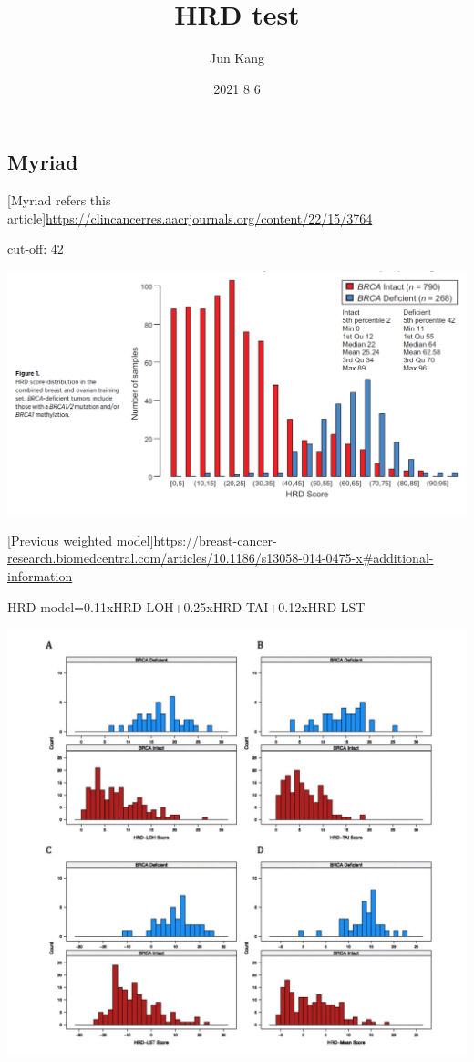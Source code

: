 \documentclass[
]{article}
\title{HRD test}
\author{Jun Kang}
\date{2021 8 6}
\begin{document}
\maketitle

\hypertarget{myriad}{%
\subsection{Myriad}\label{myriad}}

{[}Myriad refers this
article{]}\url{https://clincancerres.aacrjournals.org/content/22/15/3764}

cut-off: 42

\includegraphics{img/telli.png}

\pagebreak

{[}Previous weighted
model{]}\url{https://breast-cancer-research.biomedcentral.com/articles/10.1186/s13058-014-0475-x\#additional-information}

HRD‐model=0.11xHRD‐LOH+0.25xHRD‐TAI+0.12xHRD‐LST

\includegraphics{img/Timms.png}
\end{document}
